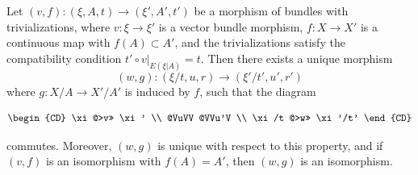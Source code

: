 Let $(v, f): (\xi, A, t) \rightarrow (\xi', A', t')$ be a morphism of bundles with trivializations, where $v: \xi \rightarrow \xi'$ is a vector bundle morphism, $f: X \rightarrow X'$ is a continuous map with $f(A) \subset A'$, and the trivializations satisfy the compatibility condition $t' \circ v|_{E(\xi|A)} = t$. Then there exists a unique morphism
$$(w, g): (\xi/t, u, r) \rightarrow (\xi'/t', u', r')$$
where $g: X/A \rightarrow X'/A'$ is induced by $f$, such that the diagram

\[
\begin{CD}
\xi @>v>> \xi' \\
@VuVV @VVu'V \\
\xi/t @>w>> \xi'/t'
\end{CD}
\]

commutes. Moreover, $(w, g)$ is unique with respect to this property, and if $(v, f)$ is an isomorphism with $f(A) = A'$, then $(w, g)$ is an isomorphism.
